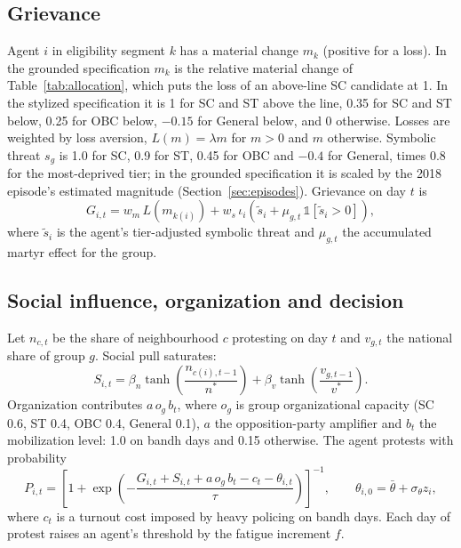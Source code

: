 \documentclass[11pt,a4paper]{article}
\begin{document}
\subsection{Grievance}
Agent $i$ in eligibility segment $k$ has a material change $m_k$ (positive for a loss). In the grounded specification $m_k$ is the relative material change of Table~\ref{tab:allocation}, which puts the loss of an above-line SC candidate at 1. In the stylized specification it is 1 for SC and ST above the line, 0.35 for SC and ST below, 0.25 for OBC below, $-0.15$ for General below, and 0 otherwise. Losses are weighted by loss aversion, $L(m)=\lambda m$ for $m>0$ and $m$ otherwise. Symbolic threat $s_g$ is 1.0 for SC, 0.9 for ST, 0.45 for OBC and $-0.4$ for General, times 0.8 for the most-deprived tier; in the grounded specification it is scaled by the 2018 episode's estimated magnitude (Section~\ref{sec:episodes}). Grievance on day $t$ is
\begin{equation}
G_{i,t}=w_m\,L(m_{k(i)})+w_s\,\iota_i\left(\tilde s_i+\mu_{g,t}\,\mathbb{1}[\tilde s_i>0]\right),
\end{equation}
where $\tilde s_i$ is the agent's tier-adjusted symbolic threat and $\mu_{g,t}$ the accumulated martyr effect for the group.

\subsection{Social influence, organization and decision}
Let $n_{c,t}$ be the share of neighbourhood $c$ protesting on day $t$ and $v_{g,t}$ the national share of group $g$. Social pull saturates:
\begin{equation}
S_{i,t}=\beta_n\tanh\!\left(\frac{n_{c(i),t-1}}{n^*}\right)+\beta_v\tanh\!\left(\frac{v_{g,t-1}}{v^*}\right).
\end{equation}
Organization contributes $a\,o_g\,b_t$, where $o_g$ is group organizational capacity (SC 0.6, ST 0.4, OBC 0.4, General 0.1), $a$ the opposition-party amplifier and $b_t$ the mobilization level: 1.0 on bandh days and 0.15 otherwise. The agent protests with probability
\begin{equation}
P_{i,t}=\left[1+\exp\!\left(-\frac{G_{i,t}+S_{i,t}+a\,o_g\,b_t-c_t-\theta_{i,t}}{\tau}\right)\right]^{-1},
\qquad \theta_{i,0}=\bar\theta+\sigma_\theta z_i ,
\end{equation}
where $c_t$ is a turnout cost imposed by heavy policing on bandh days. Each day of protest raises an agent's threshold by the fatigue increment $f$.
\end{document}

